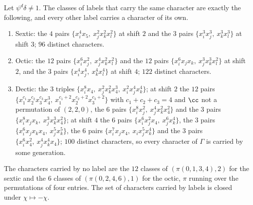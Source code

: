 \begin{proposition}\label{prop:wchars}
Let $\psi^d\delta\ne1$. The classes of labels that carry the same character
are exactly the following, and every other label carries a character of its
own.
\begin{enumerate}[label=\textup{(\alph*)},leftmargin=*,itemsep=1pt]
\item Sextic: the $4$ pairs $\{x_i^4x_5,\ x_j^2x_k^2x_l^2\}$ at shift
$2$ and the $3$ pairs $\{x_i^3x_j^3,\ x_k^3x_l^3\}$ at shift $3$; $96$
distinct characters.
\item Octic: the $12$ pairs $\{x_i^6x_j^2,\ x_j^4x_k^2x_l^2\}$ and the $12$
pairs $\{x_i^6x_jx_k,\ x_j^3x_k^3x_l^2\}$ at shift $2$, and the $3$ pairs
$\{x_i^4x_j^4,\ x_k^4x_l^4\}$ at shift $4$; $122$ distinct characters.
\item Dectic: the $3$ triples $\{x_i^8x_4,\ x_j^2x_k^2x_4^3,\
x_i^2x_j^4x_k^4\}$; at shift $2$ the $12$ pairs $\{x_1^{c_1}x_2^{c_2}
x_3^{c_3}x_4^3,\ x_1^{c_1+2}x_2^{c_2+2}x_3^{c_3+2}\}$ with $c_1+c_2+c_3=4$
and $\cc$ not a permutation of $(2,2,0)$, the $6$ pairs
$\{x_i^8x_j^2,\ x_j^4x_k^2x_4^2\}$ and the $3$ pairs
$\{x_i^8x_jx_k,\ x_j^3x_k^3x_4^2\}$; at shift $4$ the $6$ pairs
$\{x_i^6x_j^2x_4,\ x_j^6x_k^4\}$, the $3$ pairs
$\{x_i^6x_jx_kx_4,\ x_j^5x_k^5\}$, the $6$ pairs
$\{x_i^7x_jx_4,\ x_ix_j^5x_k^4\}$ and the $3$ pairs
$\{x_i^6x_4^2,\ x_j^4x_k^4x_4\}$; $100$ distinct characters, so every
character of $\Gamma$ is carried by some generation.
\end{enumerate}
The characters carried by no label are the $12$ classes of
$(\pi(0,1,3,4),2)$ for the sextic and the $6$ classes of
$(\pi(0,2,4,6),1)$ for the octic, $\pi$ running over the permutations of
four entries. The set of characters carried by labels is closed under
$\chi\mapsto-\chi$.
\end{proposition}

